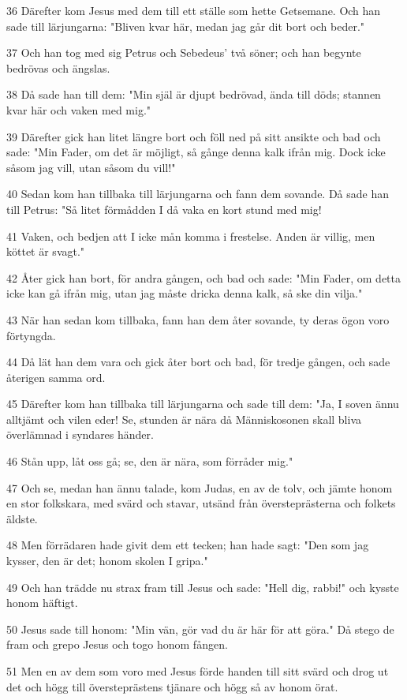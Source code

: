 \par 36 Därefter kom Jesus med dem till ett ställe som hette Getsemane. Och han sade till lärjungarna: "Bliven kvar här, medan jag går dit bort och beder."
\par 37 Och han tog med sig Petrus och Sebedeus' två söner; och han begynte bedrövas och ängslas.
\par 38 Då sade han till dem: "Min själ är djupt bedrövad, ända till döds; stannen kvar här och vaken med mig."
\par 39 Därefter gick han litet längre bort och föll ned på sitt ansikte och bad och sade: "Min Fader, om det är möjligt, så gånge denna kalk ifrån mig. Dock icke såsom jag vill, utan såsom du vill!"
\par 40 Sedan kom han tillbaka till lärjungarna och fann dem sovande. Då sade han till Petrus: "Så litet förmådden I då vaka en kort stund med mig!
\par 41 Vaken, och bedjen att I icke mån komma i frestelse. Anden är villig, men köttet är svagt."
\par 42 Åter gick han bort, för andra gången, och bad och sade: "Min Fader, om detta icke kan gå ifrån mig, utan jag måste dricka denna kalk, så ske din vilja."
\par 43 När han sedan kom tillbaka, fann han dem åter sovande, ty deras ögon voro förtyngda.
\par 44 Då lät han dem vara och gick åter bort och bad, för tredje gången, och sade återigen samma ord.
\par 45 Därefter kom han tillbaka till lärjungarna och sade till dem: "Ja, I soven ännu alltjämt och vilen eder! Se, stunden är nära då Människosonen skall bliva överlämnad i syndares händer.
\par 46 Stån upp, låt oss gå; se, den är nära, som förråder mig."
\par 47 Och se, medan han ännu talade, kom Judas, en av de tolv, och jämte honom en stor folkskara, med svärd och stavar, utsänd från översteprästerna och folkets äldste.
\par 48 Men förrädaren hade givit dem ett tecken; han hade sagt: "Den som jag kysser, den är det; honom skolen I gripa."
\par 49 Och han trädde nu strax fram till Jesus och sade: "Hell dig, rabbi!" och kysste honom häftigt.
\par 50 Jesus sade till honom: "Min vän, gör vad du är här för att göra." Då stego de fram och grepo Jesus och togo honom fången.
\par 51 Men en av dem som voro med Jesus förde handen till sitt svärd och drog ut det och högg till översteprästens tjänare och högg så av honom örat.
